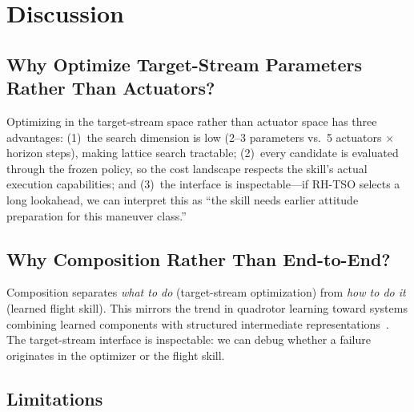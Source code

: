 \documentclass{article}
\begin{document}

\section{Discussion}

\subsection{Why Optimize Target-Stream Parameters Rather Than Actuators?}

Optimizing in the target-stream space rather than actuator space has three advantages: (1)~the search dimension is low (2--3 parameters vs.\ 5 actuators $\times$ horizon steps), making lattice search tractable; (2)~every candidate is evaluated through the frozen policy, so the cost landscape respects the skill's actual execution capabilities; and (3)~the interface is inspectable---if RH-TSO selects a long lookahead, we can interpret this as ``the skill needs earlier attitude preparation for this maneuver class.''

\subsection{Why Composition Rather Than End-to-End?}

Composition separates \emph{what to do} (target-stream optimization) from \emph{how to do it} (learned flight skill).
This mirrors the trend in quadrotor learning toward systems combining learned components with structured intermediate representations~\citep{kaufmann2023deep,kaufmann2019combining}.
The target-stream interface is inspectable: we can debug whether a failure originates in the optimizer or the flight skill.

\subsection{Limitations}
\end{document}
